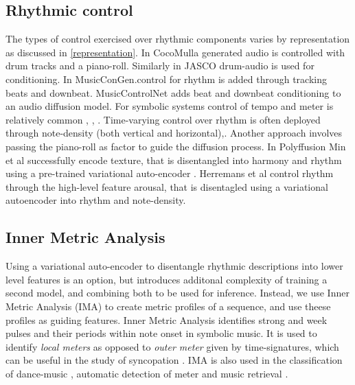 \subsection{Rhythmic control} \label{section:rhytmic_weight}
The types of control exercised over rhythmic components varies by representation as discussed in \ref{representation}. In CocoMulla \cite{Lin_cocomulla_2024} generated audio is controlled with drum tracks and a piano-roll. Similarly in JASCO\cite{Tal_jasco} drum-audio is used for conditioning. In MusicConGen.\cite{Lan_Hsiao_Cheng_Yang_musicongen_2024}control for rhythm is added through tracking beats and downbeat. MusicControlNet\cite{Wu_Donahue_musicontrolnet_2023} adds beat and downbeat conditioning to an audio diffusion model.
For symbolic systems control of tempo and meter is relatively common \cite{Rütte_figaro_2023}, \cite{Huang_Yang_remi_pop_transformer_2020}, \cite{Lu_Xu_Kang_Yu_Xing_Tan_Bian_MuseCoco_2023}. Time-varying control over rhythm is often deployed through note-density (both vertical and horizontal)\cite{Rütte_figaro_2023},\cite{Huang_rule_diffusion_2024}. Another approach \cite{Zhu_Liu_Jiang_Zheng_texture_2024} involves passing the piano-roll as factor to guide the diffusion process. In Polyffusion\cite{Min_Jiang_Xia_Zhao_polyffusion_2023} Min et al successfully encode texture, that is disentangled into harmony and rhythm using a pre-trained variational auto-encoder \cite{Wang_vae_chord_rhythm_2020}. Herremans et al \cite{Tan_Herremans_2020} control rhythm through the high-level feature arousal, that is disentagled using a variational autoencoder into rhythm and note-density. 


\subsection{Inner Metric Analysis} 
Using a variational auto-encoder to disentangle rhythmic descriptions into lower level features is an option, but introduces additonal complexity of training a second model, and combining both to be used for inference. Instead, we use Inner Metric Analysis (IMA) to create metric profiles of a sequence, and use theese profiles as guiding features. Inner Metric Analysis identifies strong and week pulses and their periods within note onset in symbolic music.\cite{} It is used to identify \textit{local meters} as opposed to \textit{outer meter} given by time-signatures, which can be useful in the study of syncopation \cite{Bemman2024}\cite{Volk2008Syncopation}. IMA is also used in the classification of dance-music \cite{Chew_Volk_Lee_Dance_metric_weight_2005}, automatic detection of meter \cite{Haas_Volk_2016} and music retrieval \cite{Volk_Garbers_VanKranenburg_Wiering_Grijp_Veltkamp_2009}. 

